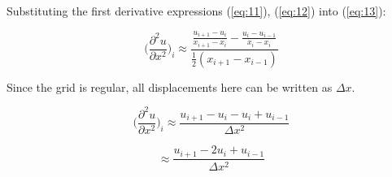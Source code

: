 \documentclass[twocolumn,12pth]{article}
\begin{document}
Substituting the first derivative expressions (\ref{eq:11}), (\ref{eq:12}) into (\ref{eq:13}):

\begin{equation}
\bigg(\frac{\partial^2{u}}{\partial{x^2}}\bigg)_{i} \approx \frac{\frac{u_{i+1} - u_i}{x_{i+1} - x_i} - \frac{u_{i} - u_{i-1}}{x_{i} - x_{i}}}{\frac{1}{2}(x_{i+1} - x_{i-1})}
\end{equation}

Since the grid is regular, all displacements here can be written as $\Delta{x}$.

\begin{equation*}
\bigg(\frac{\partial^2{u}}{\partial{x^2}}\bigg)_{i} \approx \frac{u_{i+1} - u_i - u_i + u_{i-1}}{\Delta{x^2}}
\end{equation*}

\begin{equation*}
\approx \frac{u_{i+1} - 2u_i + u_{i-1}}{\Delta{x^2}}
\end{equation*}
\end{document}
